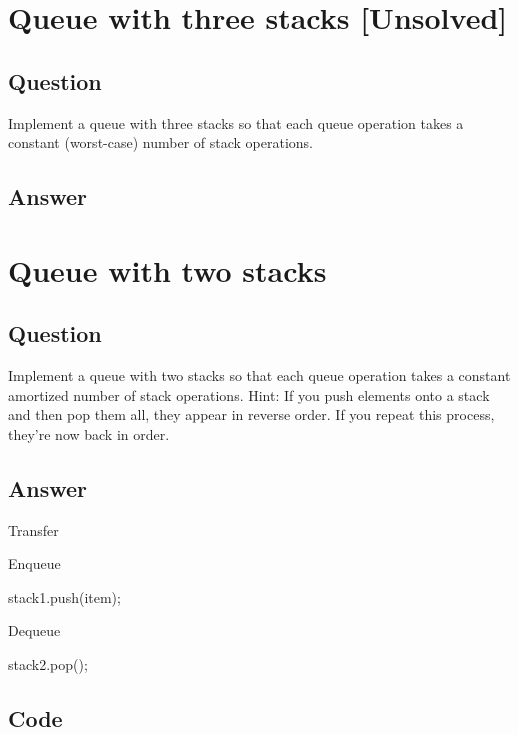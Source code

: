 \documentclass[12pt]{article}
\numberwithin{equation}{section}
\begin{document}
\newpage
\section{Queue with three stacks [Unsolved]}
\subsection*{Question}
Implement a queue with three stacks so that each
queue operation takes a constant (worst-case) number of stack operations.
\subsection*{Answer}

\newpage
\section{Queue with two stacks}
\subsection*{Question}
Implement a queue with two stacks so that each queue
operation takes a constant amortized number of stack operations. Hint: If you push
elements onto a stack and then pop them all, they appear in reverse order. If you repeat
this process, they’re now back in order.
\subsection*{Answer}
\begin{algorithm}
    \NoCaptionOfAlgo
    \caption{Transfer}
\end{algorithm}

\begin{algorithm}
    \NoCaptionOfAlgo
    \caption{Enqueue}
    stack1.push(item);
\end{algorithm}

\begin{algorithm}
    \NoCaptionOfAlgo
    \caption{Dequeue}
    \Return stack2.pop();
\end{algorithm}

\subsection*{Code}
\inputminted{java}{QueueWithTwoStacks.java}
\end{document}
